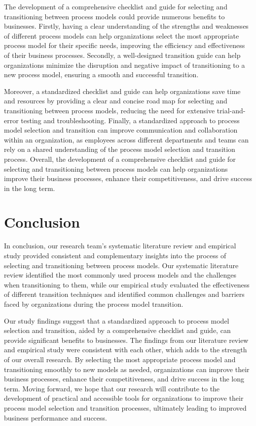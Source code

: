 \documentclass[conference]{IEEEtran}
\begin{document}
The development of a comprehensive checklist and guide for selecting and transitioning between process models could provide numerous benefits to businesses. Firstly, having a clear understanding of the strengths and weaknesses of different process models can help organizations select the most appropriate process model for their specific needs, improving the efficiency and effectiveness of their business processes. Secondly, a well-designed transition guide can help organizations minimize the disruption and negative impact of transitioning to a new process model, ensuring a smooth and successful transition.

Moreover, a standardized checklist and guide can help organizations save time and resources by providing a clear and concise road map for selecting and transitioning between process models, reducing the need for extensive trial-and-error testing and troubleshooting. Finally, a standardized approach to process model selection and transition can improve communication and collaboration within an organization, as employees across different departments and teams can rely on a shared understanding of the process model selection and transition process. Overall, the development of a comprehensive checklist and guide for selecting and transitioning between process models can help organizations improve their business processes, enhance their competitiveness, and drive success in the long term.

\section{Conclusion}
In conclusion, our research team's systematic literature review and empirical study provided consistent and complementary insights into the process of selecting and transitioning between process models. Our systematic literature review identified the most commonly used process models and the challenges when transitioning to them, while our empirical study evaluated the effectiveness of different transition techniques and identified common challenges and barriers faced by organizations during the process model transition.

Our study findings suggest that a standardized approach to process model selection and transition, aided by a comprehensive checklist and guide, can provide significant benefits to businesses. The findings from our literature review and empirical study were consistent with each other, which adds to the strength of our overall research. By selecting the most appropriate process model and transitioning smoothly to new models as needed, organizations can improve their business processes, enhance their competitiveness, and drive success in the long term. Moving forward, we hope that our research will contribute to the development of practical and accessible tools for organizations to improve their process model selection and transition processes, ultimately leading to improved business performance and success.

\printbibliography
\end{document}
